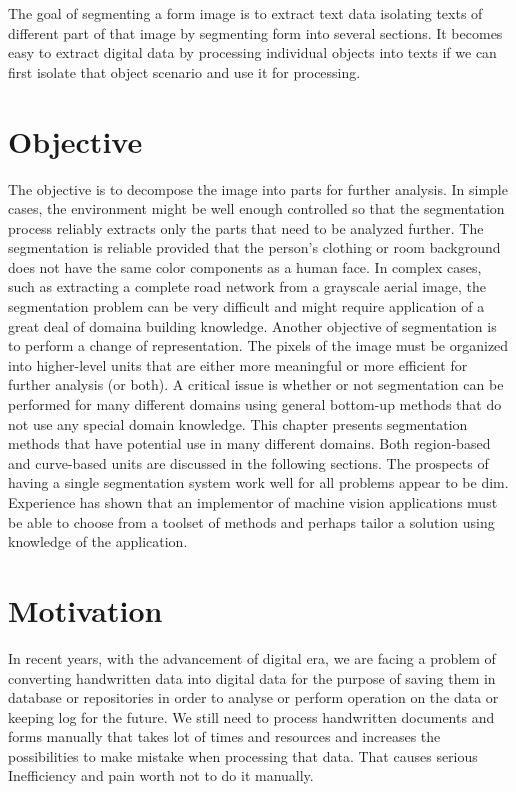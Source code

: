 The goal of segmenting a form image is to extract text data isolating texts of different part of that image by segmenting form into several sections. It becomes easy to extract digital data by processing individual objects into texts if we can first isolate that object scenario and use it for processing.
\section{Objective}
The objective is \cite{moult1} to decompose the image into parts for further analysis. In simple cases, the environment might be well enough controlled so that the segmentation process reliably extracts only the parts that need to be analyzed further. The segmentation is reliable provided that the person's clothing or room background does not have the same color components as a human face. In complex cases, such as extracting a complete road network from a grayscale aerial image, the segmentation problem can be very difficult and might require application of a great deal of domaina building knowledge.
Another objective of segmentation is to perform a change of representation. The pixels of the image must be organized into higher-level units that are either more meaningful or more efficient for further analysis (or both). A critical issue is whether or not segmentation can be performed for many different domains using general bottom-up methods that do not use any special domain knowledge. This chapter presents segmentation methods that have potential use in many different domains. Both region-based and curve-based units are discussed in the following sections. The prospects of having a single segmentation system work well for all problems appear to be dim. Experience has shown that an implementor of machine vision applications must be able to choose from a toolset of methods and perhaps tailor a solution using knowledge of the application.
\section{Motivation}
In recent years, with the advancement of digital era, we are facing a problem of converting handwritten data into digital data for the purpose of saving them in database or repositories in order to analyse or perform operation on the data or keeping log for the future. We still need to process handwritten documents and forms manually that takes lot of times and resources and increases the possibilities to make mistake when processing that data. That causes serious Inefficiency and pain worth not to do it manually.


